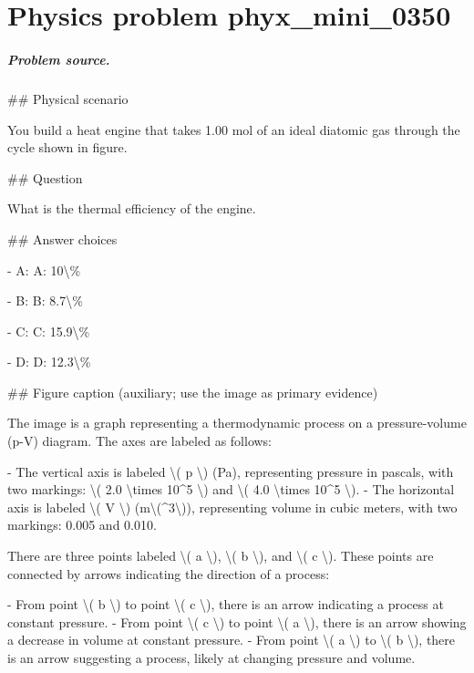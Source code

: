 
\chapter{Physics problem phyx\_mini\_0350}
\label{ch:PhyXMiniProblems_problem_phyx_mini_0350}

\paragraph{Problem source.}
\#\# Physical scenario

You build a heat engine that takes 1.00 mol of an ideal diatomic gas through the cycle shown in figure.

\#\# Question

What is the thermal efficiency of the engine.

\#\# Answer choices

- A: A: 10\textbackslash{}\%

- B: B: 8.7\textbackslash{}\%

- C: C: 15.9\textbackslash{}\%

- D: D: 12.3\textbackslash{}\%

\#\# Figure caption (auxiliary; use the image as primary evidence)

The image is a graph representing a thermodynamic process on a pressure-volume (p-V) diagram. The axes are labeled as follows:

- The vertical axis is labeled \textbackslash{}( p \textbackslash{}) (Pa), representing pressure in pascals, with two markings: \textbackslash{}( 2.0 \textbackslash{}times 10\textasciicircum{}5 \textbackslash{}) and \textbackslash{}( 4.0 \textbackslash{}times 10\textasciicircum{}5 \textbackslash{}).
- The horizontal axis is labeled \textbackslash{}( V \textbackslash{}) (m\textbackslash{}(\textasciicircum{}3\textbackslash{})), representing volume in cubic meters, with two markings: 0.005 and 0.010.

There are three points labeled \textbackslash{}( a \textbackslash{}), \textbackslash{}( b \textbackslash{}), and \textbackslash{}( c \textbackslash{}). These points are connected by arrows indicating the direction of a process:

- From point \textbackslash{}( b \textbackslash{}) to point \textbackslash{}( c \textbackslash{}), there is an arrow indicating a process at constant pressure.
- From point \textbackslash{}( c \textbackslash{}) to point \textbackslash{}( a \textbackslash{}), there is an arrow showing a decrease in volume at constant pressure.
- From point \textbackslash{}( a \textbackslash{}) to \textbackslash{}( b \textbackslash{}), there is an arrow suggesting a process, likely at changing pressure and volume.

